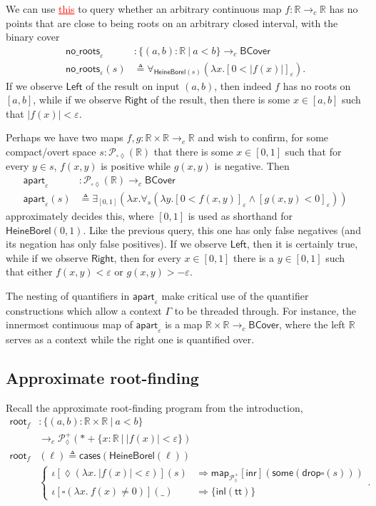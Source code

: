 \documentclass[conference]{IEEEtran}
\newcommand{\PLower}{\mathcal{P}_\lozenge}
\newcommand{\Viet}{\mathcal{P}_{\square\lozenge}}
\newcommand{\cto}{\to_c}
\newcommand{\R}{\mathbb{R}}
\newcommand{\map}[2]{\mathsf{map}_{#1}[{#2}]}
\newcommand{\fun}[2]{\lambda {#1}.\  {#2}}
\newcommand{\suchthat}{\ |\ }
\newcommand{\One}{\ast}
\newcommand{\wildcard}{\_}
\newcommand{\oinclf}[1]{\iota[{#1}]}
\newcommand{\oincl}[2]{\oinclf{#1} \left({#2}\right)}
\newcommand{\Branch}{\Rightarrow}
\newcommand{\BCover}{\mathsf{BCover}}
\newcommand{\RootFindingCode}{
\mathsf{root}_f &: \{ (a, b) : \R \times \R \suchthat a < b \}
  \\ &\cto \PLower^+(\One + \{ x : \R \suchthat |f(x)| < \varepsilon \})
\\ \mathsf{root}_f&(\ell) \triangleq \mathsf{cases}(\mathsf{HeineBorel}(\ell))
\\ &\begin{cases}
\oincl{\lozenge (\fun{x}{|f(x)| < \varepsilon})}{s} 
  &\Branch \map{\PLower^+}{\mathsf{inr}}(\mathsf{some}(\mathsf{drop}\square(s)))
\\ \oincl{\square (\fun{x}{f(x) \neq 0})}{\wildcard}
  &\Branch \{ \mathsf{inl}(\mathsf{tt}) \}
\end{cases}
}
\newcommand{\grammar}[1]{\textcolor{red}{\underline{#1}}}
\begin{document}
We can use \grammar{this} to query whether an arbitrary continuous map $f : \R \cto \R$ has no points that are close to being roots on an arbitrary closed interval, with the binary cover
\begin{align*}
\mathsf{no\_roots}_{\varepsilon} &: \{ (a, b) : \R \suchthat a < b\} \cto \BCover
\\ \mathsf{no\_roots}_\varepsilon(s) &\triangleq
  \forall_{\mathsf{HeineBorel}(s)}(\lambda x. [ 0 < |f(x)| ]_\varepsilon).
\end{align*}
If we observe $\mathsf{Left}$ of the result on input $(a, b)$, then indeed $f$ has no roots on $[a, b]$, while if we observe $\mathsf{Right}$ of the result, then there is some $x \in [a, b]$ such that $|f(x)| < \varepsilon$.

Perhaps we have two maps $f, g : \R \times \R \cto \R$ and wish to confirm, for some compact/overt space $s : \Viet(\R)$ that there is some $x \in [0,1]$ such that for every $y \in s$, $f(x, y)$ is positive while $g(x,y)$ is negative. Then
\begin{align*}
\mathsf{apart}_{\varepsilon} &: \Viet(\R) \cto \BCover
\\ \mathsf{apart}_\varepsilon(s) &\triangleq
  \exists_{[0,1]}(\lambda x. \forall_{s}(\lambda y. [ 0 < f(x, y) ]_\varepsilon \wedge [g(x, y) < 0]_\varepsilon))
\end{align*}
approximately decides this, where $[0,1]$ is used as shorthand for $\mathsf{HeineBorel}(0,1)$.
Like the previous query, this one has only false negatives (and its negation has only false positives). If we observe $\mathsf{Left}$, then it is certainly true, while if we observe $\mathsf{Right}$, then for every $x \in [0,1]$ there is a $y \in [0,1]$ such that either $f(x, y) < \varepsilon$ or $g(x, y) > -\varepsilon$.

The nesting of quantifiers in $\mathsf{apart}_\varepsilon$ make critical use of the quantifier constructions which allow a context $\Gamma$ to be threaded through. For instance, the innermost continuous map of $\mathsf{apart}_\varepsilon$ is a map $\R \times \R \cto \BCover$, where the left $\R$ serves as a context while the right one is quantified over.

\subsection{Approximate root-finding}
\label{s:bcov:root}

Recall the approximate root-finding program from the introduction,
\begin{align*}
\RootFindingCode.
\end{align*}
\end{document}
